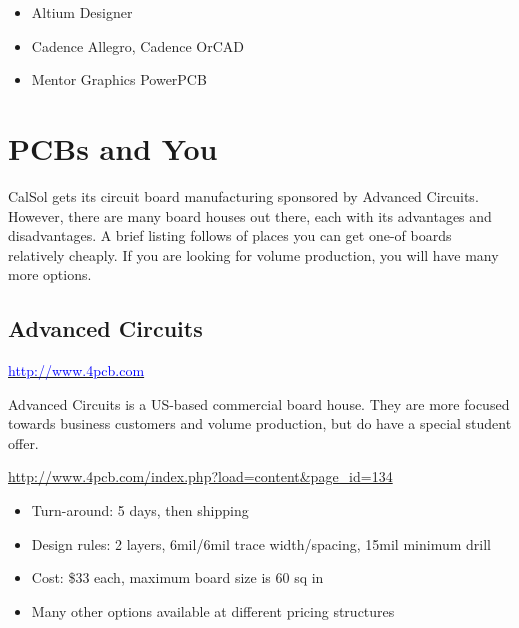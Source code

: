 \documentclass[letterpaper]{article}
\newcommand\liststyleRTFNumxii{%
\renewcommand\labelitemi{{\textbullet}}
\renewcommand\labelitemii{o}
\renewcommand\labelitemiii{${\blacksquare}$}
\renewcommand\labelitemiv{{\textbullet}}
}
\newcommand\liststyleRTFNumxv{%
\renewcommand\labelitemi{{\textbullet}}
\renewcommand\labelitemii{o}
\renewcommand\labelitemiii{${\blacksquare}$}
\renewcommand\labelitemiv{{\textbullet}}
}
\begin{document}
\liststyleRTFNumxii
\begin{itemize}
\item {\sffamily\color[rgb]{0.30980393,0.5058824,0.7411765}
Altium Designer}
\item {\sffamily\color[rgb]{0.30980393,0.5058824,0.7411765}
Cadence Allegro, Cadence OrCAD}
\item {\sffamily\color[rgb]{0.30980393,0.5058824,0.7411765}
Mentor Graphics PowerPCB}
\end{itemize}
\clearpage
\bigskip

\section{PCBs and You}
\hypertarget{Toc337742712}{}{\sffamily\color[rgb]{0.30980393,0.5058824,0.7411765}
CalSol gets its circuit board manufacturing sponsored by Advanced Circuits. However, there are many board houses out
there, each with its advantages and disadvantages. A brief listing follows of places you can get one-of boards
relatively cheaply. If you are looking for volume production, you will have many more options.}

\subsection{Advanced Circuits}
\hypertarget{Toc337742713}{}{\sffamily\color[rgb]{0.30980393,0.5058824,0.7411765}
\href{http://www.4pcb.com/}{\textcolor{blue}{http://www.4pcb.com}} }

{\sffamily\color[rgb]{0.30980393,0.5058824,0.7411765}
Advanced Circuits is a US-based commercial board house. They are more focused towards business customers and volume
production, but do have a special student offer.}

{\sffamily\color[rgb]{0.30980393,0.5058824,0.7411765}
\url{http://www.4pcb.com/index.php?load=content&page_id=134} }

\liststyleRTFNumxv
\begin{itemize}
\item {\sffamily\color[rgb]{0.30980393,0.5058824,0.7411765}
Turn-around: 5 days, then shipping}
\item {\sffamily\color[rgb]{0.30980393,0.5058824,0.7411765}
Design rules: 2 layers, 6mil/6mil trace width/spacing, 15mil minimum drill}
\item {\sffamily\color[rgb]{0.30980393,0.5058824,0.7411765}
Cost: \$33 each, maximum board size is 60 sq in}
\item {\sffamily\color[rgb]{0.30980393,0.5058824,0.7411765}
Many other options available at different pricing structures}
\end{itemize}
\end{document}
